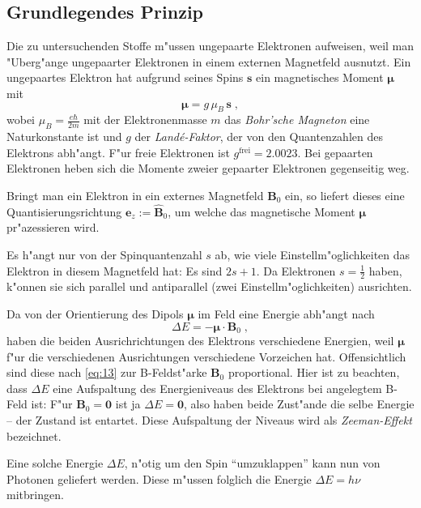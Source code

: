 \documentclass[a4paper,12pt]{article}
\renewcommand{\vec}[1]{\ensuremath{\boldsymbol{#1}}}
\begin{document}
\subsection{Grundlegendes Prinzip}
\label{sec:grundlegendes_prinzip}

Die zu untersuchenden Stoffe m"ussen ungepaarte Elektronen aufweisen,
weil man "Uberg"ange ungepaarter Elektronen in einem externen
Magnetfeld ausnutzt. Ein ungepaartes Elektron hat aufgrund seines
Spins $\vec s$ ein magnetisches Moment $\vec \mu$ mit 
\begin{equation}
  \label{eq:12}
  \vec \mu = g \, \mu_B \, \vec s \;,
\end{equation}
wobei $ \mu_B = \frac{ e \hbar } { 2 m } $ mit der Elektronenmasse $m$
das \emph{Bohr'sche Magneton} eine Naturkonstante ist und $g$ der
\emph{Land\'e-Faktor}, der von den Quantenzahlen des Elektrons
abh"angt. F"ur freie Elektronen ist $g^\text{frei} = 2.0023$.  Bei
gepaarten Elektronen heben sich die Momente zweier gepaarter
Elektronen gegenseitig weg.

Bringt man ein Elektron in ein externes Magnetfeld $\vec B_0$ ein, so
liefert dieses eine Quantisierungsrichtung $\vec e_z := \hat{\vec
  B}_0$, um welche das magnetische Moment $\vec \mu$ pr"azessieren wird.

Es h"angt nur von der Spinquantenzahl $s$ ab, wie viele
Einstellm"oglichkeiten das Elektron in diesem Magnetfeld hat: Es sind
$2s+1$. Da Elektronen $s = \frac 1 2$ haben, k"onnen sie sich parallel und
antiparallel (zwei Einstellm"oglichkeiten) ausrichten.

Da von der Orientierung des Dipols $\vec \mu$ im Feld eine Energie abh"angt
nach
\begin{equation}
  \label{eq:13}
  \Delta E = - \vec \mu \cdot \vec B_0 \;,
\end{equation}
haben die beiden Ausrichrichtungen des Elektrons verschiedene
Energien, weil $\vec \mu$ f"ur die verschiedenen Ausrichtungen verschiedene
Vorzeichen hat. Offensichtlich sind diese nach \eqref{eq:13} zur
B-Feldst"arke $\vec B_0$ proportional. Hier ist zu beachten, dass $\Delta E$
eine Aufspaltung des Energieniveaus des Elektrons bei angelegtem
B-Feld ist: F"ur $\vec B_0 = \vec 0$ ist ja $\Delta E = \vec 0$, also haben beide
Zust"ande die selbe Energie -- der Zustand ist entartet.  Diese Aufspaltung der Niveaus wird als \emph{Zeeman-Effekt} bezeichnet.

Eine solche Energie $\Delta E$, n"otig um den Spin "`umzuklappen"'
kann nun von Photonen geliefert
werden.  Diese m"ussen folglich die Energie $\Delta E = h \nu$
mitbringen.
\end{document}
